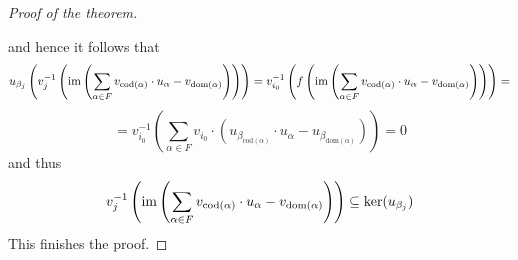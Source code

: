\begin{proof}[Proof of the theorem]
\begin{center}
\end{center}
and hence it follows that
$$u_{\beta_j}\left(v_j^{-1}\left(\mathrm{im}\left(\sum_{\alpha \in F} v_{\mathrm{cod}(\alpha)}\cdot u_{\alpha}-v_{\mathrm{dom}(\alpha)}\right)\right)\right)= v_{i_0}^{-1}\left(f\left(\mathrm{im}\left(\sum_{\alpha \in F} v_{\mathrm{cod}(\alpha)}\cdot u_{\alpha}-v_{\mathrm{dom}(\alpha)}\right)\right)\right)=$$
$$= v_{i_0}^{-1}\left(\sum_{\alpha \in F}v_{i_0}\cdot \left(u_{\beta_{\mathrm{cod}(\alpha)}}\cdot u_{\alpha}- u_{\beta_{\mathrm{dom}(\alpha)}}\right)\right)=0$$
and thus
$$v_j^{-1}\left(\mathrm{im}\left(\sum_{\alpha \in F} v_{\mathrm{cod}(\alpha)}\cdot u_{\alpha}-v_{\mathrm{dom}(\alpha)}\right)\right)\subseteq \ker(u_{\beta_j})$$
This finishes the proof.
\end{proof}

